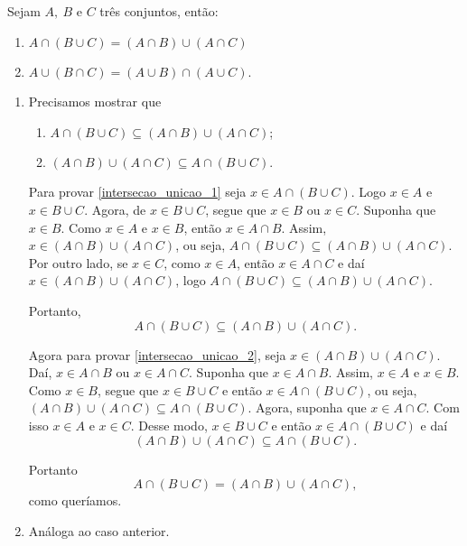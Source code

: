 \begin{proposicao} Sejam $A,\ B$ e $C$ três conjuntos, então:
    \begin{enumerate}[label={\roman*})]
        \item $A \cap (B \cup C) = (A \cap B) \cup (A \cap C)$
        \item $A \cup (B \cap C) = (A \cup B) \cap (A \cup C)$.
    \end{enumerate}
\end{proposicao}
\begin{prova}
    \begin{enumerate}[label={\roman*})]
        \item Precisamos mostrar que
        \begin{enumerate}[label=({\arabic*})]
            \item $A\cap(B\cup C)\subseteq(A\cap B)\cup(A\cap C)$;\label{intersecao_unicao_1}
            \item $(A\cap B)\cup(A\cap C)\subseteq A\cap(B\cup C).$\label{intersecao_unicao_2}
        \end{enumerate}

        Para provar \ref{intersecao_unicao_1} seja $x\in A \cap (B \cup C)$. Logo $x\in A$ e $x\in B\cup C$. Agora, de $x\in B\cup C$, segue que $x\in B$ ou $x\in C$. Suponha que $x\in B$. Como $x\in A$ e $x \in B$, então $x\in A\cap B$. Assim, $x\in(A\cap B)\cup(A\cap C)$, ou seja, $A\cap(B\cup C)\subseteq(A\cap B)\cup(A\cap C)$. Por outro lado, se $x\in C$, como $x\in A$, então $x\in A\cap C$ e daí $x\in(A\cap B)\cup(A\cap C)$, logo $A\cap(B\cup C)\subseteq(A\cap B)\cup(A\cap C)$.

        Portanto,
        \[
            A\cap(B\cup C)\subseteq(A\cap B)\cup(A\cap C).
        \]

        Agora para provar \ref{intersecao_unicao_2}, seja $x\in(A\cap B)\cup(A\cap C)$. Daí, $x\in A\cap B$ ou $x\in A\cap C$. Suponha que $x\in A\cap B$. Assim, $x\in A$ e $x\in B$. Como $x\in B$, segue que $x\in B\cup C$ e então $x\in A\cap(B\cup C)$, ou seja, $(A\cap B)\cup(A\cap C)\subseteq A\cap(B\cup C)$. Agora, suponha que $x\in A\cap C$. Com isso $x\in A$ e $x\in C$. Desse modo, $x\in B\cup C$ e então $x\in A\cap(B\cup C)$ e daí
        \[
            (A\cap B)\cup(A\cap C)\subseteq A\cap(B\cup C).
        \]

        Portanto
        \[
            A\cap(B\cup C)=(A\cap B)\cup(A\cap C),
        \]
        como queríamos.
        \item Análoga ao caso anterior.
    \end{enumerate}
\end{prova}

